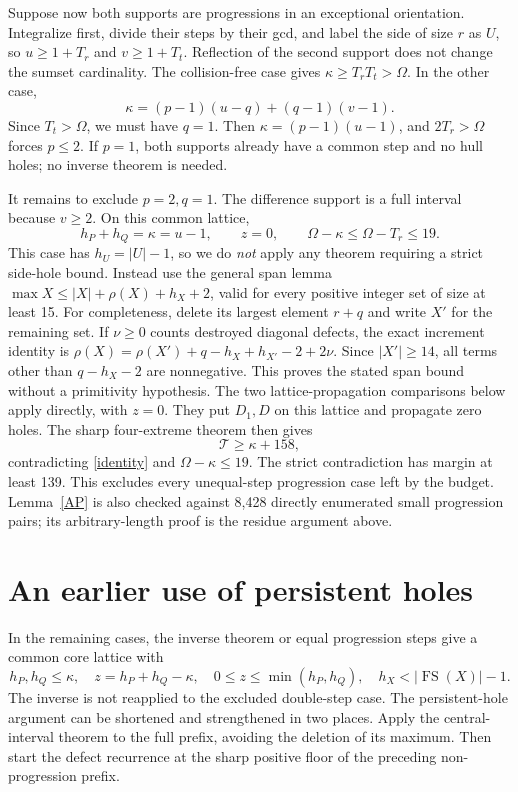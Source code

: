 \documentclass[11pt,a4paper]{article}
\newcommand{\FS}{\operatorname{FS}}
\newcommand{\T}{\mathcal T}
\begin{document}
Suppose now both supports are progressions in an exceptional orientation.
Integralize first, divide their steps by their gcd, and label the
side of size $r$ as $U$, so $u\ge1+T_r$ and $v\ge1+T_t$.
Reflection of the second support does not change the sumset cardinality.
The collision-free case gives $\kappa\ge T_rT_t>\Omega$.
In the other case,
\[
 \kappa=(p-1)(u-q)+(q-1)(v-1).
\]
Since $T_t>\Omega$, we must have $q=1$. Then
$\kappa=(p-1)(u-1)$, and $2T_r>\Omega$ forces $p\le2$.
If $p=1$, both supports already have a common step and no hull holes;
no inverse theorem is needed.

It remains to exclude $p=2,q=1$. The difference support is a full
interval because $v\ge2$. On this common lattice,
\[
 h_P+h_Q=\kappa=u-1,\qquad z=0,\qquad
 \Omega-\kappa\le\Omega-T_r\le19.
\]
This case has $h_U=|U|-1$, so we do \emph{not} apply any theorem
requiring a strict side-hole bound. Instead use the general span lemma
$\max X\le |X|+\rho(X)+h_X+2$, valid for every positive integer set
of size at least 15. For completeness, delete its largest element
$r+q$ and write $X'$ for the remaining set. If $\nu\ge0$ counts
destroyed diagonal defects, the exact increment identity is
$\rho(X)=\rho(X')+q-h_X+h_{X'}-2+2\nu$.
Since $|X'|\ge14$, all terms other than $q-h_X-2$ are nonnegative.
This proves the stated span bound without a primitivity hypothesis.
The two lattice-propagation comparisons below
apply directly, with $z=0$. They put $D_1,D$ on this lattice and
propagate zero holes. The sharp four-extreme theorem then gives
\[
 \T\ge\kappa+158,
\]
contradicting \eqref{identity} and $\Omega-\kappa\le19$.
The strict contradiction has margin at least 139.
This excludes every unequal-step progression case left by the budget.
Lemma~\ref{AP} is also checked against 8,428 directly enumerated
small progression pairs; its arbitrary-length proof is the residue
argument above.

\section{An earlier use of persistent holes}
In the remaining cases, the inverse theorem or equal progression
steps give a common core lattice with
\[
 h_P,h_Q\le\kappa,\quad z=h_P+h_Q-\kappa,
 \quad0\le z\le\min(h_P,h_Q),\quad h_X<|\FS(X)|-1.
\]
The inverse is not reapplied to the excluded double-step case.
The persistent-hole argument can be shortened and strengthened in two
places. Apply the central-interval theorem to the full prefix, avoiding
the deletion of its maximum. Then start the defect recurrence at the
sharp positive floor of the preceding non-progression prefix.
\end{document}
